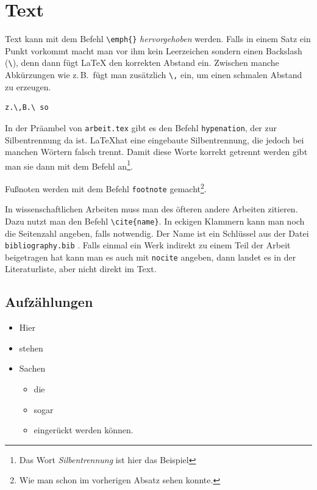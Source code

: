 \section{Text}

Text kann mit dem Befehl \verb|\emph{}| \emph{hervorgehoben} werden. Falls in einem Satz ein Punkt vorkommt macht man vor ihm kein Leerzeichen sondern einen Backslash (\verb|\|), denn dann fügt \LaTeX{} den korrekten Abstand ein. Zwischen manche Abkürzungen wie z.\,B.\ fügt man zusätzlich \verb|\,| ein, um einen schmalen Abstand zu erzeugen.

\begin{verbatim}
z.\,B.\ so
\end{verbatim}

In der Präambel von \verb|arbeit.tex| gibt es den Befehl \verb|hypenation|, der zur Silbentrennung da ist. \LaTeX hat eine eingebaute Silbentrennung, die jedoch bei manchen Wörtern falsch trennt. Damit diese Worte korrekt getrennt werden gibt man sie dann mit dem Befehl an\footnote{Das Wort \emph{Silbentrennung} ist hier das Beispiel}.

Fußnoten werden mit dem Befehl \verb|footnote| gemacht\footnote{Wie man schon im vorherigen Absatz sehen konnte.}.

In wissenschaftlichen Arbeiten muss man des öfteren andere Arbeiten zitieren. Dazu nutzt man den Befehl \verb|\cite{name}|. In eckigen Klammern kann man noch die Seitenzahl angeben, falls notwendig. Der Name ist ein Schlüssel aus der Datei \verb|bibliography.bib| \cite[S.\ 10]{kopka}. Falls einmal ein Werk indirekt zu einem Teil der Arbeit beigetragen hat kann man es auch mit \verb|nocite| angeben, dann landet es in der Literaturliste, aber nicht direkt im Text.


\subsection{Aufzählungen}

\begin{itemize}
    \item  Hier
    \item  stehen
    \item  Sachen
    \begin{itemize}
        \item  die
        \item  sogar
        \item  eingerückt werden können.
    \end{itemize}
\end{itemize}


